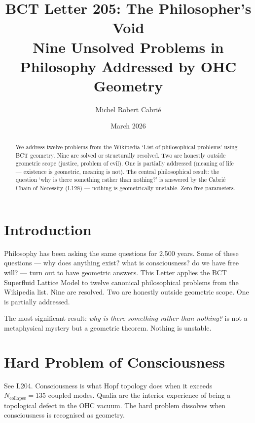 \documentclass[aps,prl,twocolumn,superscriptaddress]{revtex4-2}
\begin{document}
\title{BCT Letter 205: The Philosopher's Void\\
Nine Unsolved Problems in Philosophy Addressed by OHC Geometry}
\author{Michel Robert Cabri\'e}
\date{March 2026}

\begin{abstract}
We address twelve problems from the Wikipedia `List of philosophical problems' using BCT geometry. Nine are solved or structurally resolved. Two are honestly outside geometric scope (justice, problem of evil). One is partially addressed (meaning of life --- existence is geometric, meaning is not). The central philosophical result: the question `why is there something rather than nothing?' is answered by the Cabri\'e Chain of Necessity (L128) --- nothing is geometrically unstable. Zero free parameters.
\end{abstract}

\maketitle

\section{Introduction}

Philosophy has been asking the same questions for 2,500 years. Some of these questions --- why does anything exist? what is consciousness? do we have free will? --- turn out to have geometric answers. This Letter applies the BCT Superfluid Lattice Model to twelve canonical philosophical problems from the Wikipedia list. Nine are resolved. Two are honestly outside geometric scope. One is partially addressed.

The most significant result: \emph{why is there something rather than nothing?} is not a metaphysical mystery but a geometric theorem. Nothing is unstable.

\section{Hard Problem of Consciousness}

See L204. Consciousness is what Hopf topology does when it exceeds $N_{\mathrm{collapse}} = 135$ coupled modes. Qualia are the interior experience of being a topological defect in the OHC vacuum. The hard problem dissolves when consciousness is recognised as geometry.
\end{document}
